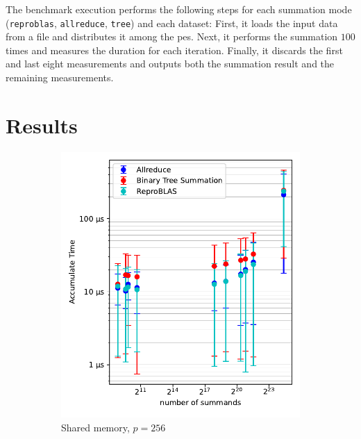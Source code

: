 The benchmark execution performs the following steps for each summation mode (\texttt{reproblas}, \texttt{allreduce}, \texttt{tree}) and each dataset:
First, it loads the input data from a file and distributes it among the \glspl{pe}.
Next, it performs the summation $100$ times and measures the duration for each iteration.
Finally, it discards the first and last eight measurements and outputs both the summation result and the remaining measurements.

\section{Results}
\label{sec:Results}

\begin{figure}
\begin{subfigure}{0.49\textwidth}
\centering
\includegraphics[scale=0.72]{figures/benchmarkScatter.pdf}
\caption{Shared memory, $p=256$}
\label{fig:benchmarkOverview256}
\end{subfigure}
\hfill
\begin{subfigure}{0.49\textwidth}
\centering

\end{subfigure}
\end{figure}
